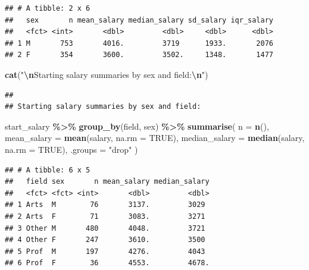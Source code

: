 \documentclass[
]{article}
\newenvironment{Shaded}{\begin{snugshade}}{\end{snugshade}}
\newcommand{\AttributeTok}[1]{\textcolor[rgb]{0.13,0.29,0.53}{#1}}
\newcommand{\ConstantTok}[1]{\textcolor[rgb]{0.56,0.35,0.01}{#1}}
\newcommand{\FunctionTok}[1]{\textcolor[rgb]{0.13,0.29,0.53}{\textbf{#1}}}
\newcommand{\NormalTok}[1]{#1}
\newcommand{\SpecialCharTok}[1]{\textcolor[rgb]{0.81,0.36,0.00}{\textbf{#1}}}
\newcommand{\StringTok}[1]{\textcolor[rgb]{0.31,0.60,0.02}{#1}}
\begin{document}
\begin{verbatim}
## # A tibble: 2 x 6
##   sex       n mean_salary median_salary sd_salary iqr_salary
##   <fct> <int>       <dbl>         <dbl>     <dbl>      <dbl>
## 1 M       753       4016.         3719      1933.       2076
## 2 F       354       3600.         3502.     1348.       1477
\end{verbatim}

\begin{Shaded}
\begin{Highlighting}[]
\FunctionTok{cat}\NormalTok{(}\StringTok{"}\SpecialCharTok{\textbackslash{}n}\StringTok{Starting salary summaries by sex and field:}\SpecialCharTok{\textbackslash{}n}\StringTok{"}\NormalTok{)}
\end{Highlighting}
\end{Shaded}

\begin{verbatim}
## 
## Starting salary summaries by sex and field:
\end{verbatim}

\begin{Shaded}
\begin{Highlighting}[]
\NormalTok{start\_salary }\SpecialCharTok{\%\textgreater{}\%}
  \FunctionTok{group\_by}\NormalTok{(field, sex) }\SpecialCharTok{\%\textgreater{}\%}
  \FunctionTok{summarise}\NormalTok{(}
    \AttributeTok{n =} \FunctionTok{n}\NormalTok{(),}
    \AttributeTok{mean\_salary =} \FunctionTok{mean}\NormalTok{(salary, }\AttributeTok{na.rm =} \ConstantTok{TRUE}\NormalTok{),}
    \AttributeTok{median\_salary =} \FunctionTok{median}\NormalTok{(salary, }\AttributeTok{na.rm =} \ConstantTok{TRUE}\NormalTok{),}
    \AttributeTok{.groups =} \StringTok{"drop"}
\NormalTok{  )}
\end{Highlighting}
\end{Shaded}

\begin{verbatim}
## # A tibble: 6 x 5
##   field sex       n mean_salary median_salary
##   <fct> <fct> <int>       <dbl>         <dbl>
## 1 Arts  M        76       3137.         3029 
## 2 Arts  F        71       3083.         3271 
## 3 Other M       480       4048.         3721 
## 4 Other F       247       3610.         3500 
## 5 Prof  M       197       4276.         4043 
## 6 Prof  F        36       4553.         4678.
\end{verbatim}
\end{document}

